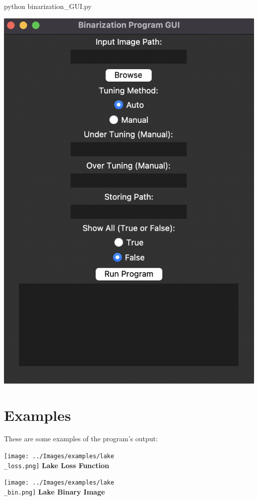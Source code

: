 \documentclass{article}
\begin{document}
\begin{bashscript}
python binarization\_GUI.py
\end{bashscript}

\includegraphics[scale=0.6]{../Images/examples/GUI.png}

\section{Examples}

These are some examples of the program's output:

\texttt{[image: ../Images/examples/lake\\\_loss.png]} \textbf{Lake Loss Function}

\texttt{[image: ../Images/examples/lake\\\_bin.png]} \textbf{Lake Binary Image}
\end{document}

